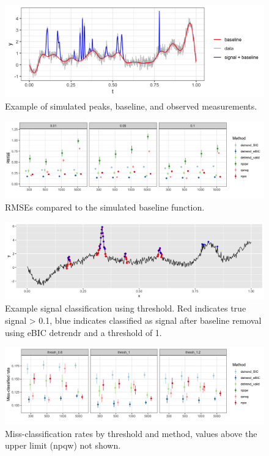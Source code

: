\documentclass[12pt]{article}
\begin{document}
	\begin{figure}
		\caption{Example of simulated peaks, baseline, and observed measurements.}
		\includegraphics[width = \linewidth]{Figures/ex_peaks.png}
	\end{figure}
	
	
	\begin{figure}[h!]
		\caption{RMSEs compared to the simulated baseline function.}
		\includegraphics[width = \linewidth]{Figures/peaks_mse.png}
	\end{figure}
	
	\begin{figure}[h!]
		\caption{Example signal classification using threshold. Red indicates true signal > 0.1, blue indicates classified as signal after baseline removal using eBIC detrendr and a threshold of 1.}
		\includegraphics[width = \linewidth]{Figures/peaks_eg_class.png}
	\end{figure}
	
	\begin{figure}[h!]
		\caption{Miss-classification rates by threshold and method, values above the upper limit (npqw) not shown.}
		\includegraphics[width = \linewidth]{Figures/peaks_missclass.png}
	\end{figure}
	
\end{document}

